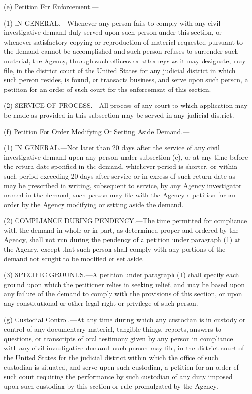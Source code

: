 (e) Petition For Enforcement.—

(1) IN GENERAL.—Whenever any person fails to comply with any civil investigative demand duly served upon such person under this section, or whenever satisfactory copying or reproduction of material requested pursuant to the demand cannot be accomplished and such person refuses to surrender such material, the Agency, through such officers or attorneys as it may designate, may file, in the district court of the United States for any judicial district in which such person resides, is found, or transacts business, and serve upon such person, a petition for an order of such court for the enforcement of this section.

(2) SERVICE OF PROCESS.—All process of any court to which application may be made as provided in this subsection may be served in any judicial district.

(f) Petition For Order Modifying Or Setting Aside Demand.—

(1) IN GENERAL.—Not later than 20 days after the service of any civil investigative demand upon any person under subsection (c), or at any time before the return date specified in the demand, whichever period is shorter, or within such period exceeding 20 days after service or in excess of such return date as may be prescribed in writing, subsequent to service, by any Agency investigator named in the demand, such person may file with the Agency a petition for an order by the Agency modifying or setting aside the demand.

(2) COMPLIANCE DURING PENDENCY.—The time permitted for compliance with the demand in whole or in part, as determined proper and ordered by the Agency, shall not run during the pendency of a petition under paragraph (1) at the Agency, except that such person shall comply with any portions of the demand not sought to be modified or set aside.

(3) SPECIFIC GROUNDS.—A petition under paragraph (1) shall specify each ground upon which the petitioner relies in seeking relief, and may be based upon any failure of the demand to comply with the provisions of this section, or upon any constitutional or other legal right or privilege of such person.

(g) Custodial Control.—At any time during which any custodian is in custody or control of any documentary material, tangible things, reports, answers to questions, or transcripts of oral testimony given by any person in compliance with any civil investigative demand, such person may file, in the district court of the United States for the judicial district within which the office of such custodian is situated, and serve upon such custodian, a petition for an order of such court requiring the performance by such custodian of any duty imposed upon such custodian by this section or rule promulgated by the Agency.

